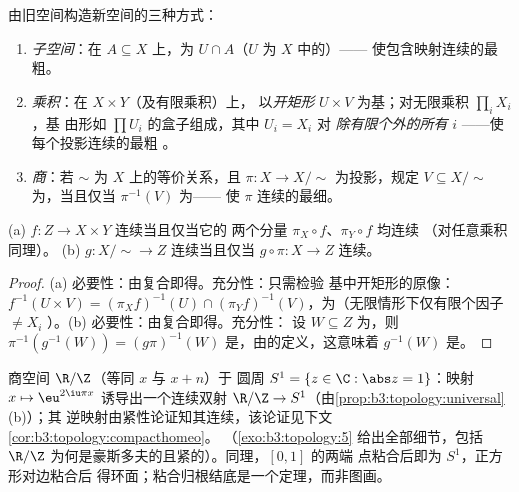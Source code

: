 \begin{definition}\label{def:b3:topology:constructions}
由旧空间构造新空间的三种方式：
\begin{enumerate}
  \item \emph{子空间}：在 $A \subseteq X$ 上，为
        $U \cap A$（$U$ 为 $X$ 中的）——
        使包含映射连续的最粗。
  \item \emph{乘积}：在 $X \times Y$（及有限乘积）上，
        以\emph{开矩形} $U \times
        V$ 为基；对无限乘积 $\prod_i X_i$，基
        由形如 $\prod U_i$ 的盒子组成，其中 $U_i = X_i$ 对
        \emph{除有限个外的所有} $i$ ——使每个投影连续的最粗
        。
  \item \emph{商}：若 $\sim$ 为 $X$ 上的等价关系，且
        $\pi\colon X \to X/{\sim}$ 为投影，规定 $V
        \subseteq X/{\sim}$ 为，当且仅当 $\pi^{-1}(V)$ 为——
        使 $\pi$ 连续的最细。
\end{enumerate}
\end{definition}

\begin{proposition}[泛性质]
\label{prop:b3:topology:universal}
(a) $f \colon Z \to X \times Y$ 连续当且仅当它的
两个分量 $\pi_X \circ f$、$\pi_Y \circ f$ 均连续
（对任意乘积同理）。
(b) $g \colon X/{\sim} \to Z$ 连续当且仅当 $g \circ \pi
\colon X \to Z$ 连续。
\end{proposition}

\begin{proof}
(a) 必要性：由复合即得。充分性：只需检验
基中开矩形的原像：$f^{-1}(U \times V) = (\pi_Xf)^{-1}(U)
\cap (\pi_Yf)^{-1}(V)$，为（无限情形下仅有限个因子 $\neq X_i$
）。(b) 必要性：由复合即得。充分性：
设 $W \subseteq Z$ 为，则 $\pi^{-1}(g^{-1}(W)) = (g\pi)^{-1}(W)$
是，由的定义，这意味着
$g^{-1}(W)$ 是。
\end{proof}

\begin{example}\label{ex:b3:topology:circle}
商空间 $\R/\Z$（等同 $x$ 与 $x + n$）于
圆周 $S^1 = \{z \in \C : \abs z = 1\}$：映射 $x
\mapsto \eu^{2\iu\pi x}$ 诱导出一个连续双射
$\R/\Z \to S^1$（由\cref{prop:b3:topology:universal}(b)）；其
逆映射由紧性论证知其连续，该论证见下文
\cref{cor:b3:topology:compacthomeo}。
（\cref{exo:b3:topology:5} 给出全部细节，包括
$\R/\Z$ 为何是豪斯多夫的且紧的）。同理，$[0,1]$ 的两端
点粘合后即为 $S^1$，正方形对边粘合后
得环面；粘合归根结底是一个定理，而非图画。
\end{example}

